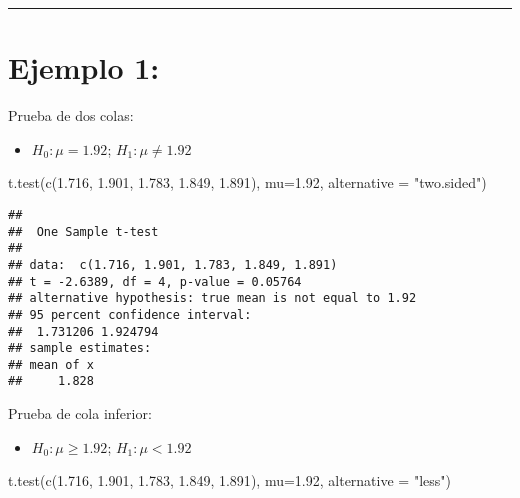 \documentclass[
]{book}
\newenvironment{Shaded}{\begin{snugshade}}{\end{snugshade}}
\newcommand{\AttributeTok}[1]{\textcolor[rgb]{0.77,0.63,0.00}{#1}}
\newcommand{\FloatTok}[1]{\textcolor[rgb]{0.00,0.00,0.81}{#1}}
\newcommand{\FunctionTok}[1]{\textcolor[rgb]{0.00,0.00,0.00}{#1}}
\newcommand{\NormalTok}[1]{#1}
\newcommand{\StringTok}[1]{\textcolor[rgb]{0.31,0.60,0.02}{#1}}
\providecommand{\tightlist}{%
  \setlength{\itemsep}{0pt}\setlength{\parskip}{0pt}}
\begin{document}
\begin{center}\rule{0.5\linewidth}{0.5pt}\end{center}

\hypertarget{ejemplo-1-5}{%
\section{Ejemplo 1:}\label{ejemplo-1-5}}

Prueba de dos colas:

\begin{itemize}
\tightlist
\item
  \(H_0:\mu=1.92\); \(H_1:\mu\neq 1.92\)
\end{itemize}

\begin{Shaded}
\begin{Highlighting}[]
\FunctionTok{t.test}\NormalTok{(}\FunctionTok{c}\NormalTok{(}\FloatTok{1.716}\NormalTok{, }\FloatTok{1.901}\NormalTok{, }\FloatTok{1.783}\NormalTok{, }\FloatTok{1.849}\NormalTok{, }\FloatTok{1.891}\NormalTok{), }
       \AttributeTok{mu=}\FloatTok{1.92}\NormalTok{, }\AttributeTok{alternative =} \StringTok{"two.sided"}\NormalTok{)}
\end{Highlighting}
\end{Shaded}

\begin{verbatim}
## 
##  One Sample t-test
## 
## data:  c(1.716, 1.901, 1.783, 1.849, 1.891)
## t = -2.6389, df = 4, p-value = 0.05764
## alternative hypothesis: true mean is not equal to 1.92
## 95 percent confidence interval:
##  1.731206 1.924794
## sample estimates:
## mean of x 
##     1.828
\end{verbatim}

Prueba de cola inferior:

\begin{itemize}
\tightlist
\item
  \(H_0:\mu \geq 1.92\); \(H_1:\mu < 1.92\)
\end{itemize}

\begin{Shaded}
\begin{Highlighting}[]
\FunctionTok{t.test}\NormalTok{(}\FunctionTok{c}\NormalTok{(}\FloatTok{1.716}\NormalTok{, }\FloatTok{1.901}\NormalTok{, }\FloatTok{1.783}\NormalTok{, }\FloatTok{1.849}\NormalTok{, }\FloatTok{1.891}\NormalTok{), }
       \AttributeTok{mu=}\FloatTok{1.92}\NormalTok{, }\AttributeTok{alternative =} \StringTok{"less"}\NormalTok{)}
\end{Highlighting}
\end{Shaded}
\end{document}
